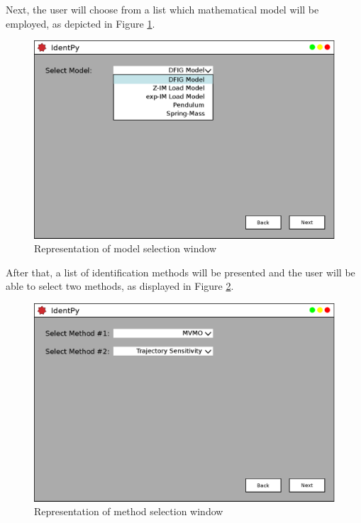 Next, the user will choose from a list which mathematical model will be employed, as depicted in Figure \ref{fig: pg1}. 

\begin{figure}[h]
	\caption{Representation of model selection window}
	\begin{center}
		\includegraphics[scale=.5]{Images/Software_pg1.eps}
	\end{center}
	\label{fig: pg1}
\end{figure}

After that, a list of identification methods will be presented and the user will be able to select two methods, as displayed in Figure \ref{fig: pg2}.

\begin{figure}[h]
	\caption{Representation of method selection window}
	\begin{center}
		\includegraphics[scale=.5]{Images/Software_pg2.eps}
	\end{center}
	\label{fig: pg2}
\end{figure}


